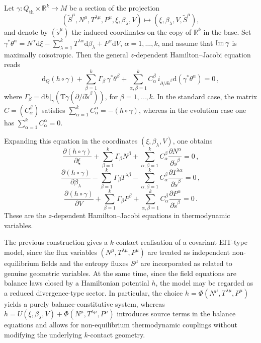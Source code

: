 \documentclass[11pt,twoside]{article}
\theoremstyle{plain}
\theoremstyle{definition}
\theoremstyle{remark}
\newcommand{\dd}{\mathrm{d}}
\renewcommand{\d}{\mathrm{d}}
\newcommand{\T}{\mathrm{T}}
\begin{document}
Let $\gamma\colon Q_{\mathrm{th}}\times\mathbb{R}^k\to M$ be a section of the projection
\[
(\widetilde{S}^\mu,N^\mu,T^{\lambda\mu},P^\mu,\xi,\beta_\lambda,V)\longmapsto (\xi,\beta_\lambda,V,\widetilde{S}^\mu),
\]
and denote by $(\widetilde{s}^\mu)$ the induced coordinates on the copy of $\mathbb{R}^k$ in the base. Set $\gamma^*\theta^\alpha=N^\alpha \d\xi-\sum_{\lambda=1}^k T^{\lambda\alpha}\d\beta_\lambda+P^\alpha \d V$, $\alpha=1,\dots,k$, and assume that ${\rm Im}\,\gamma$ is maximally coisotropic. Then the general $z$-dependent Hamilton--Jacobi equation reads
\[
\dd_Q(h\circ\gamma)+\sum_{\beta=1}^k\Gamma_\beta\,\gamma^*\theta^\beta+\sum_{\alpha,\beta=1}^k C^\beta_{\alpha}\,i_{\partial/\partial \tilde{s}^\beta}\dd(\gamma^*\theta^\alpha)=0\,,
\]
where $\Gamma_\beta=\d h|_\gamma(\T\gamma(\partial/\partial \widetilde{s}^\beta))$, for $\beta=1,\dots,k$. In the standard case, the matrix $C=(C^\beta_\alpha)$ satisfies $\sum_{\alpha=1}^k C^\alpha_\alpha=-(h\circ\gamma)$, whereas in the evolution case one has $\sum_{\alpha=1}^k C^\alpha_\alpha=0$.

Expanding this equation in the coordinates $(\xi,\beta_\lambda,V)$, one obtains
\[
\frac{\partial(h\circ\gamma)}{\partial \xi}
+\sum_{\beta=1}^k\Gamma_\beta N^\beta
+\sum_{\alpha,\beta=1}^k C^\beta_\alpha\frac{\partial N^\alpha}{\partial \widetilde{s}^\beta}=0\,,
\]
\[
\frac{\partial(h\circ\gamma)}{\partial \beta_\lambda}
-\sum_{\beta=1}^k\Gamma_\beta T^{\lambda\beta}
-\sum_{\alpha,\beta=1}^k C^\beta_\alpha\frac{\partial T^{\lambda\alpha}}{\partial \widetilde{s}^\beta}=0\,,
\]
\[
\frac{\partial(h\circ\gamma)}{\partial V}
+\sum_{\beta=1}^k\Gamma_\beta P^\beta
+\sum_{\alpha,\beta=1}^k C^\beta_\alpha\frac{\partial P^\alpha}{\partial \widetilde{s}^\beta}=0\,.
\]
These are the $z$-dependent Hamilton--Jacobi equations in thermodynamic variables.

The previous construction gives a $k$-contact realisation of a covariant EIT-type model, since the flux variables $(N^\mu,T^{\lambda\mu},P^\mu)$ are treated as independent non-equilibrium fields and the entropy fluxes $S^\mu$ are incorporated as related to genuine geometric variables. At the same time, since the field equations are balance laws closed by a Hamiltonian potential $h$, the model may be regarded as a reduced divergence-type sector. In particular, the choice $h=\Phi(N^\mu,T^{\lambda\mu},P^\mu)$ yields a purely balance-constitutive system, whereas $h=U(\xi,\beta_\lambda,V)+\Phi(N^\mu,T^{\lambda\mu},P^\mu)$ introduces source terms in the balance equations and allows for non-equilibrium thermodynamic couplings without modifying the underlying $k$-contact geometry.
\end{document}

